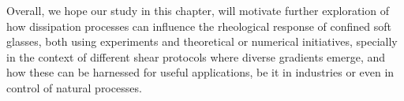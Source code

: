 
Overall, we hope our study in this chapter, will motivate further exploration of how dissipation processes can influence the rheological response of confined soft glasses, both using experiments and theoretical or numerical initiatives, specially in the context of different shear protocols where diverse gradients emerge, and how these can be harnessed for useful applications, be it in industries or even in control of natural processes. 

